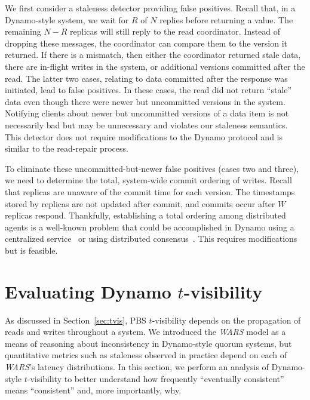 \documentclass{vldb}
\newcommand{\sectionskip}{-0em}
\begin{document}
We first consider a staleness detector providing false positives.
Recall that, in a Dynamo-style system, we wait for $R$ of $N$ replies
before returning a value.  The remaining $N-R$ replicas will still
reply to the read coordinator.  Instead of dropping these messages,
the coordinator can compare them to the version it returned.  If there
is a mismatch, then either the coordinator returned stale data, there
are in-flight writes in the system, or additional versions committed
after the read. The latter two cases, relating to data committed after
the response was initiated, lead to false positives.  In these cases,
the read did not return ``stale'' data even though there were newer
but uncommitted versions in the system.  Notifying clients about newer
but uncommitted versions of a data item is not necessarily bad but may
be unnecessary and violates our staleness semantics.  This detector
does not require modifications to the Dynamo protocol and is similar
to the read-repair process.

To eliminate these uncommitted-but-newer false positives (cases two
and three), we need to determine the total, system-wide commit
ordering of writes. Recall that replicas are unaware of the commit
time for each version. The timestamps stored by replicas are not
updated after commit, and commits occur after $W$ replicas
respond. Thankfully, establishing a total ordering among distributed
agents is a well-known problem that could be accomplished in Dynamo
using a centralized service~\cite{zookeeper} or using distributed
consensus~\cite{paxos}. This requires modifications but is feasible.



\vspace{\sectionskip}\section{Evaluating Dynamo {\large $t$}-visibility}
\label{sec:dynamoeval}

As discussed in Section~\ref{sec:tvis}, PBS $t$-visibility depends on
the propagation of reads and writes throughout a system.  We
introduced the \textit{WARS} model as a means of reasoning about
inconsistency in Dynamo-style quorum systems, but quantitative metrics
such as staleness observed in practice depend on each of
\textit{WARS}'s latency distributions.  In this section, we perform an
analysis of Dynamo-style $t$-visibility to better understand how
frequently ``eventually consistent'' means ``consistent'' and, more
importantly, why.
\end{document}
